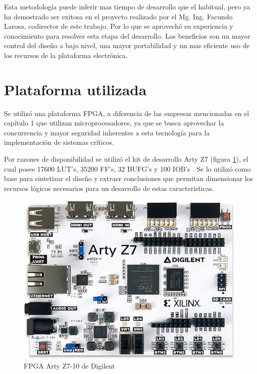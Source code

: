 	Esta metodología puede inferir mas tiempo de desarrollo que el habitual, pero ya ha demostrado ser exitosa en el proyecto realizado por el Mg. Ing. Facundo Larosa, codirector de este trabajo. Por lo que se aprovechó su experiencia y conocimiento para resolver esta etapa del desarrollo. Los beneficios son un mayor control del diseño a bajo nivel, una mayor portabilidad y un mas eficiente uso de los recursos de la plataforma electrónica.


\section{Plataforma utilizada}
	\label{FPGA_P}
	Se utilizó una plataforma FPGA, a diferencia de las empresas mencionadas en el capítulo 1 que utilizan microprocesadores, ya que se busca aprovechar la concurrencia y mayor seguridad inherentes a esta tecnología \cite{cite23,cite24,cite25} para la implementación de sistemas
críticos.

	Por razones de disponibilidad se utilizó el kit de desarrollo Arty Z7  (figura \ref{fig:FPGA}), el cual posee 17600 LUT’s, 35200 FF’s, 32 BUFG’s y 100 IOB’s \cite{cite28}. Se lo utilizó como base para sintetizar el diseño y extraer conclusiones que permitan dimensionar los recursos lógicos necesarios para un desarrollo de estas características.
	
	\begin{figure}[h]
	\centering
		\includegraphics[scale=.55]{./Figures/FPGA}
		\caption{FPGA Arty Z7-10 de Digilent}
	\label{fig:FPGA}	
	\end{figure}			
			
